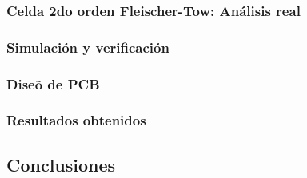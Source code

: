 \subsubsection{Celda 2do orden Fleischer-Tow: An\'alisis real}

\subsubsection{Simulaci\'on y verificaci\'on}

\subsubsection{Dise\~o de PCB}

\subsubsection{Resultados obtenidos}

\subsection{Conclusiones} 
